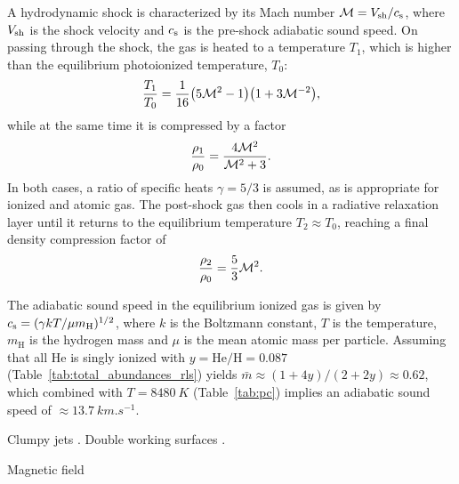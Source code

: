 \documentclass[useAMS, usenatbib]{mnras}
\begin{document}
A hydrodynamic shock is characterized by its Mach number \(\mathcal{M} = V_{\mathrm{sh}} / c_{\mathrm{s}}\),
where \(V_{\mathrm{sh}}\) is the shock velocity and \(c_{\mathrm{s}}\) is the pre-shock adiabatic sound speed.
On passing through the shock, the gas is heated 
\citep{ZelDovich:1969a} to a temperature \(T_1\),
which is higher than the equilibrium photoionized temperature, \(T_0\):
\begin{equation}
  \label{eq:T1-T0}
  \frac{T_1}{T_0} = \frac{1}{16} \bigl( 5 \mathcal{M}^2 - 1 \bigr)
  \bigl( 1 + 3\mathcal{M}^{-2} \bigr),
\end{equation}
while at the same time it is compressed by a factor
\begin{equation}
  \label{eq:rho1-rho0}
  \frac{\rho_1}{\rho_0} = \frac{4 \mathcal{M}^2}{\mathcal{M}^2 + 3} .
\end{equation}
In both cases, a ratio of specific heats \(\gamma = 5/3\) is assumed,
as is appropriate for ionized and atomic gas. 
The post-shock gas then cools in a radiative relaxation layer
until it returns to the equilibrium temperature \(T_2 \approx T_0\),
reaching a final density compression factor of 
\begin{equation}
  \label{eq:rho2-rho0}
  \frac{\rho_2}{\rho_0} = \frac53 \mathcal{M}^2 .
\end{equation}

The adiabatic sound speed in the equilibrium ionized gas is given by
\(c_{\mathrm{s}} = (\gamma k T / \mu m_{\mathrm{H}})^{1/2}\),
where \(k\) is the Boltzmann constant, \(T\) is the temperature,
\(m_{\mathrm{H}}\) is the hydrogen mass
and \(\mu\) is the mean atomic mass per particle.
Assuming that all He is singly ionized with
\(y = \mathrm{He/H} = 0.087\) (Table~\ref{tab:total_abundances_rls}) yields
\(\bar{m} \approx (1 + 4 y) / (2 + 2 y) \approx 0.62\),
which combined with \(T = \SI{8480}{K}\) (Table~\ref{tab:pc})
implies an adiabatic sound speed of \(\approx\SI{13.7}{km.s^{-1}}\). 

Clumpy jets \citep{Yirak:2009a, Yirak:2012a}.  Double working surfaces \citep{Raga:2017b}.   

Magnetic field \citep{Hansen:2017a, Pudritz:2019a}


\end{document}
